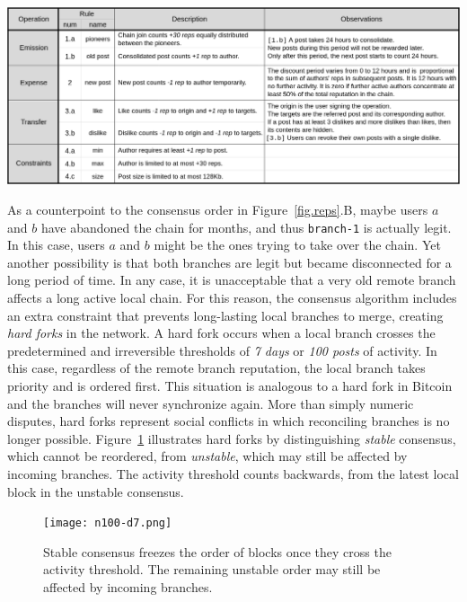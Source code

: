 \documentclass[10pt,journal,compsoc]{IEEEtran}
\newcommand{\FC}       {Freechains\xspace}
\newcommand{\code}[1]  {\texttt{\footnotesize{#1}}}
\begin{document}
\begin{table}
\centering
\includegraphics[width=\textwidth]{rules.png}
\caption{
    Reputation rules for public forum chains in \FC.
    The chosen constants ($30~reps$, $24h$, etc) are arbitrary and target
    typical Internet forums with moderate traffic.
    A future revision of the protocol could support them as chain parameters.
}
\label{fig.rules}
\end{table}

As a counterpoint to the consensus order in Figure~\ref{fig.reps}.B, maybe
users $a$ and $b$ have abandoned the chain for months, and thus \code{branch-1}
is actually legit.
In this case, users $a$ and $b$ might be the ones trying to take over the
chain.
Yet another possibility is that both branches are legit but became disconnected
for a long period of time.
In any case, it is unacceptable that a very old remote branch affects a long
active local chain.
%
For this reason, the consensus algorithm includes an extra constraint that
prevents long-lasting local branches to merge, creating \emph{hard forks} in
the network.
A hard fork occurs when a local branch crosses the predetermined and
irreversible thresholds of \emph{7 days} or \emph{100 posts} of activity.
In this case, regardless of the remote branch reputation, the local branch
takes priority and is ordered first.
This situation is analogous to a hard fork in Bitcoin and the branches will
never synchronize again.
More than simply numeric disputes, hard forks represent social conflicts in
which reconciling branches is no longer possible.
%
Figure~\ref{fig.hard} illustrates hard forks by distinguishing \emph{stable}
consensus, which cannot be reordered, from \emph{unstable}, which may still be
affected by incoming branches.
The activity threshold counts backwards, from the latest local block in the
unstable consensus.

\begin{figure}
\centering
\texttt{[image: n100-d7.png]}
\caption{
    Stable consensus freezes the order of blocks once they cross the activity
    threshold.
    The remaining unstable order may still be affected by incoming branches.
}
\label{fig.hard}
\end{figure}
\end{document}
